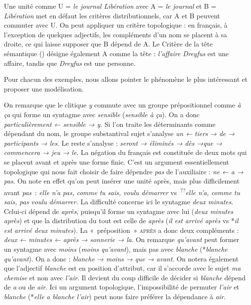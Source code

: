 {     Une unité comme U = \textit{le journal Libération} avec A = \textit{le journal} et B = \textit{Libération} met en défaut les critères distributionnels, car A et B peuvent commuter avec U. On peut appliquer un critère topologique : en français, à l’exception de quelques adjectifs, les compléments d’un nom se placent à sa droite, ce qui laisse supposer que B dépend de A. Le Critère de la tête sémantique () désigne également A comme la tête : \textit{l’affaire Dreyfus} est une affaire, tandis que \textit{Dreyfus} est une personne.

     Pour chacun des exemples, nous allons pointer le phénomène le plus intéressant et proposer une modélisation.
    \begin{exe}
     On remarque que le clitique \textit{y} commute avec un groupe prépositionnel comme \textit{à ça} qui forme un syntagme avec \textit{sensible} (\textit{sensible à ça}). On a donc \textit{particulièrement ← sensible → y.}
     Si l’on traite les déterminants comme dépendant du nom, le groupe substantival sujet s’analyse \textit{un ← tiers → de → participants → les.} Le reste s’analyse : \textit{seront → éliminés → dès →que → commencera → jeu → le.}
     La négation du français est constituée de deux mots qui se placent avant et après une forme finie. C’est un argument essentiellement topologique qui nous fait choisir de faire dépendre \textit{pas} de l’auxiliaire : \textit{ne ← a → pas}. On note en effet qu’on peut insérer une unité après, mais plus difficilement avant \textit{pas~}: \textit{elle n’a pas, comme tu sais, voulu démarrer} vs~\textsuperscript{??}\textit{elle n’a, comme tu sais, pas voulu démarrer.}
     La difficulté concerne ici le syntagme \textit{deux minutes}. Celui-ci dépend de \textit{après}, puisqu’il forme un syntagme avec lui (\textit{deux minutes après}) et que la distribution du tout est celle de \textit{après} (\textit{il est arrivé après} vs *\textit{il est arrivé deux minutes}). La «~préposition~» \textsc{après} a donc deux compléments : \textit{deux ← minutes ← après → sonnerie → la}.
     On remarque \textit{qu’avant} peut former un syntagme avec \textit{moins} (\textit{moins qu’avant}), mais pas avec \textit{blanche} (*\textit{blanche qu’avant}). On a donc : \textit{blanche → moins → que → avant}. On notera également que l’adjectif \textit{blanche} est en position d’attribut, car il s’accorde avec le sujet \textit{ma chemise} et non avec \textit{l’air}. Il devient du coup difficile de décider si \textit{blanche} dépend de \textit{a} ou de \textit{air}. Ici un argument topologique, l’impossibilité de permuter \textit{l’air} et \textit{blanche} (*\textit{elle a blanche l’air}) peut nous faire préférer la dépendance à \textit{air}.

\end{exe}}
